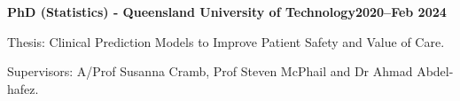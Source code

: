 \textbf{PhD (Statistics) - Queensland University of Technology\hfill 2020--Feb 2024} \par
Thesis: Clinical Prediction Models to Improve Patient Safety and Value of Care.\par
Supervisors: A/Prof Susanna Cramb, Prof Steven McPhail and Dr Ahmad Abdel-hafez.\par